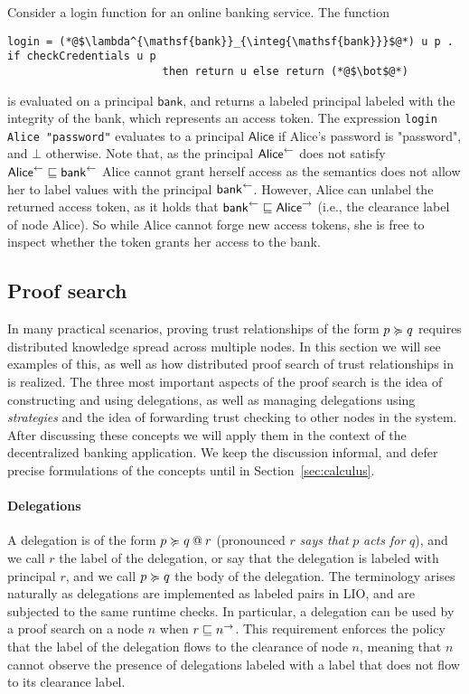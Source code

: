 Consider a login function for an online banking service. The function
\begin{lstlisting}
login = (*@$\lambda^{\mathsf{bank}}_{\integ{\mathsf{bank}}}$@*) u p . if checkCredentials u p
                        then return u else return (*@$\bot$@*)
\end{lstlisting}
is evaluated on a principal $\mathsf{bank}$, and returns a labeled principal labeled with the integrity of the bank, which represents an access token. The expression \lstinline[mathescape]!login Alice "password"! evaluates to a principal $\mathsf{Alice}$ if Alice's password is "password", and $\bot$ otherwise. Note that, as the principal $\integ{\mathsf{Alice}}$ does not satisfy $\integ{\mathsf{Alice}} \flowsto \integ{\mathsf{bank}}$ Alice cannot grant herself access as the semantics does not allow her to label values with the principal $\integ{\mathsf{bank}}$.
However, Alice can unlabel the returned access token, as it holds that $\integ{\mathsf{bank}} \flowsto \conf{\mathsf{Alice}}$ (i.e., the clearance label of node Alice). So while Alice cannot forge new access tokens, she is free to inspect whether the token grants her access to the bank.

\subsection{Proof search}
In many practical scenarios, proving trust relationships of the form $p \actsfor q$ requires distributed knowledge spread across multiple nodes. In this section we will see examples of this, as well as how distributed proof search of trust relationships in \lang{} is realized. The three most important aspects of the proof search is the idea of constructing and using delegations, as well as managing delegations using \emph{strategies} and the idea of forwarding trust checking to other nodes in the system. After discussing these concepts we will apply them in the context of the decentralized banking application. We keep the discussion informal, and defer precise formulations of the concepts until in Section~\ref{sec:calculus}.

\paragraph{Delegations}
A delegation is of the form $\lb{r}{p \actsfor q}$ (pronounced $r$ \emph{says that} $p$ \emph{acts for} $q$), and we call $r$ the label of the delegation, or say that the delegation is labeled with principal $r$, and we call $p \actsfor q$ the body of the delegation. The terminology arises naturally as delegations are implemented as labeled pairs in LIO, and are subjected to the same runtime checks. In particular, a delegation can be used by a proof search on a node $n$ when $r \flowsto \conf{n}$. This requirement enforces the policy that the label of the delegation flows to the clearance of node $n$, meaning that $n$ cannot observe the presence of delegations labeled with a label that does not flow to its clearance label.

